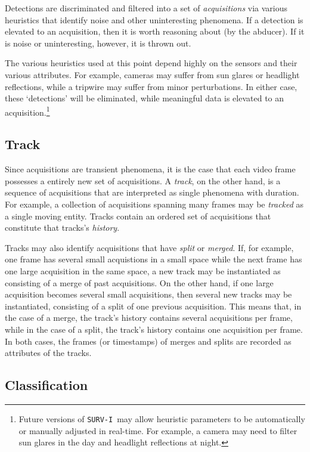 \documentclass{book}
\newcommand{\prog}{{\tt SURV-I}~}
\begin{document}
Detections are discriminated and filtered into a set of \emph{acquisitions} via
various heuristics that identify noise and other uninteresting phenomena. If a
detection is elevated to an acquisition, then it is worth reasoning about (by
the abducer). If it is noise or uninteresting, however, it is thrown out.

The various heuristics used at this point depend highly on the sensors and their
various attributes. For example, cameras may suffer from sun glares or headlight
reflections, while a tripwire may suffer from minor perturbations. In either
case, these `detections' will be eliminated, while meaningful data is elevated
to an acquisition.\footnote{Future versions of \prog may allow heuristic
parameters to be automatically or manually adjusted in real-time. For
example, a camera may need to filter sun glares in the day and headlight
reflections at night.}

\subsection{Track}
\label{sec:track}

Since acquisitions are transient phenomena, it is the case that each video frame
possesses a entirely new set of acquisitions. A \emph{track}, on the other hand,
is a sequence of acquisitions that are interpreted as single phenomena with
duration.  For example, a collection of acquisitions spanning many frames may be
\emph{tracked} as a single moving entity. Tracks contain an ordered set of
acquisitions that constitute that tracks's \emph{history}.

Tracks may also identify acquisitions that have \emph{split} or \emph{merged}.
If, for example, one frame has several small acquistions in a small space while
the next frame has one large acquisition in the same space, a new track may be
instantiated as consisting of a merge of past acquisitions. On the other hand,
if one large acquisition becomes several small acquisitions, then several new
tracks may be instantiated, consisting of a split of one previous acquisition.
This means that, in the case of a merge, the track's history contains several
acquisitions per frame, while in the case of a split, the track's history
contains one acquisition per frame. In both cases, the frames (or timestamps) of
merges and splits are recorded as attributes of the tracks.

\subsection{Classification}
\label{sec:classification}
\end{document}
